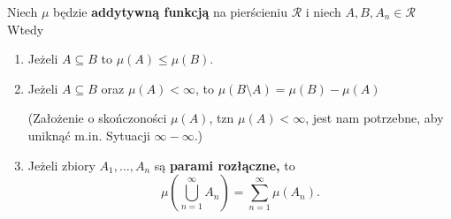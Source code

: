 \begin{lemma}
	Niech $\mu $ będzie \textbf{addytywną funkcją } na pierścieniu $\mathcal{R}$ i niech $A,B, A_{n} \in  \mathcal{R}$ 
	Wtedy
	\begin{enumerate}[label=\alph*)]
		\item Jeżeli $A\subseteq B$ to $\mu \left( A \right) \le \mu\left( B \right) $.
		\item Jeżeli $A\subseteq B$ oraz $\mu \left( A \right) < \infty$, to $\mu \left( B\setminus A \right) = \mu\left( B \right) - \mu \left( A \right) $ 

			(Założenie o skończoności $\mu\left( A \right) $, tzn $\mu\left( A \right) < \infty$, jest nam potrzebne, aby uniknąć m.in. Sytuacji $\infty - \infty$.)
		\item Jeżeli zbiory $A_1,\ldots, A_{n}$ są \textbf{parami rozłączne,} to
			\[
			\mu \left(\bigcup_{n=1} ^{\infty} A_{n} \right)= \sum_{n=1}^{\infty} \mu \left( A_{n} \right)  
			.\] 
	\end{enumerate}
\end{lemma} 
